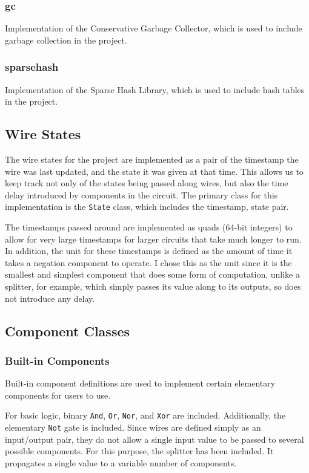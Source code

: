 \documentclass{article}
\newcommand{\ClassName}[1]{\texttt{#1}}
\begin{document}
\subsubsection{gc}

Implementation of the Conservative Garbage Collector, which is used to include garbage collection in the project.\cite{gc}

\subsubsection{sparsehash}

Implementation of the Sparse Hash Library, which is used to include hash tables in the project.\cite{sparsehash}

\subsection{Wire States}

The wire states for the project are implemented as a pair of the timestamp the wire was last updated, and the state it was given at that time. This allows us to keep track not only of the states being passed along wires, but also the time delay introduced by components in the circuit. The primary class for this implementation is the \ClassName{State} class, which includes the timestamp, state pair.

The timestamps passed around are implemented as quads (64-bit integers) to allow for very large timestamps for larger circuits that take much longer to run. In addition, the unit for these timestamps is defined as the amount of time it takes a negation component to operate. I chose this as the unit since it is the smallest and simplest component that does some form of computation, unlike a splitter, for example, which simply passes its value along to its outputs, so does not introduce any delay.

\subsection{Component Classes}

\subsubsection{Built-in Components}

Built-in component definitions are used to implement certain elementary components for users to use.

For basic logic, binary \ClassName{And}, \ClassName{Or}, \ClassName{Nor}, and \ClassName{Xor} are included. Additionally,  the elementary \ClassName{Not} gate is included. Since wires are defined simply as an input/output pair, they do not allow a single input value to be passed to several possible components. For this purpose, the splitter has been included. It propagates a single value to a variable number of components.
\end{document}
